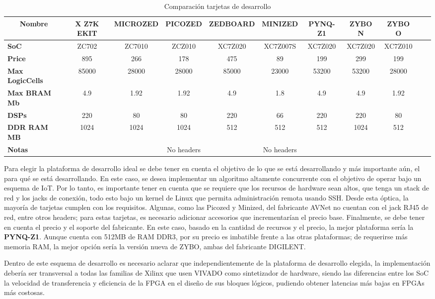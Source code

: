 \begin{table}[h!]
\small
\centering
\begin{adjustbox}{width=1.1\textwidth}
\small
\begin{tabular}{|l|c|c|c|c|c|c|c|c|c|c|}
\hline
\multicolumn{1}{|c|}{\textbf{Nombre}} & \textbf{X Z7K EKIT} & \textbf{MICROZED} & \textbf{PICOZED} & \textbf{ZEDBOARD} & \textbf{MINIZED} & \textbf{PYNQ-Z1} & \textbf{ZYBO N} & \textbf{ZYBO O} \\ \hline
\textbf{SoC} & ZC702 & ZC7010 & ZCZ010 & XC7Z020 & XC7Z007S & XC7Z020 & XC7Z020 & XC7Z010 \\ \hline
\textbf{Price} & 895 & 266 & 178 & 475 & 89 & 199 & 299 & 199 \\ \hline
\textbf{Max LogicCells} & 85000 & 28000 & 28000 & 85000 & 23000 & 53200 & 53200 & 28000 \\ \hline
\textbf{Max BRAM Mb} & 4.9 & 1.92 & 1.92 & 4.9 & 1.8 & 4.9 & 4.9 & 1.92 \\ \hline
\textbf{DSPs} & 220 & 80 & 80 & 220 & 66 & 220 & 220 & 80 \\ \hline
\textbf{DDR RAM MB} & 1024 & 1024 & 1024 & 512 & 512 & 512 & 1024 & 512 \\ \hline
\textbf{Notas} &  &  & No headers &  & No headers &  &  &  \\ \hline
\end{tabular}%
\end{adjustbox}
\caption{Comparación tarjetas de desarrollo}
\label{fpgaComparison}
\end{table}

Para elegir la plataforma de desarrollo ideal se debe tener en cuenta el objetivo de lo que se está desarrollando y más importante aún, el para qué se está desarrollando. En este caso, se desea implementar un algoritmo altamente concurrente con el objetivo de operar bajo un esquema de IoT. Por lo tanto, es importante tener en cuenta que se requiere que los recursos de hardware sean altos, que tenga un stack de red y los jacks de conexión, todo esto bajo un kernel de Linux que permita administración remota usando SSH. Desde esta óptica, la mayoría de tarjetas cumplen con los requisitos. Algunas, como las Picozed y Minized, del fabricante AVNet no cuentan con el jack RJ45 de red, entre otros headers; para estas tarjetas, es necesario adicionar accesorios que incrementarían el precio base. Finalmente, se debe tener en cuenta el precio y el soporte del fabricante. En este caso, basado en la cantidad de recursos y el precio, la mejor plataforma sería la \textbf{PYNQ-Z1}. Aunque cuenta con 512MB de RAM DDR3, por su precio es imbatible frente a las otras plataformas; de requerirse más memoria RAM, la mejor opción sería la versión nueva de ZYBO, ambas del fabricante DIGILENT.

Dentro de este esquema de desarrollo es necesario aclarar que independientemente de la plataforma de desarrollo elegida, la implementación debería ser transversal a todas las familias de Xilinx que usen VIVADO como sintetizador de hardware, siendo las diferencias entre los SoC la velocidad de transferencia y eficiencia de la FPGA en el diseño de sus bloques lógicos, pudiendo obtener latencias más bajas en FPGAs más costosas.
